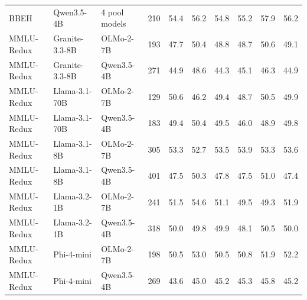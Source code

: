 \begin{tabular}{lll r rrrrrr}
BBEH & Qwen3.5-4B & 4 pool models & 210 & 54.4 & 56.2 & 54.8 & 55.2 & 57.9 & 56.2 \\
MMLU-Redux & Granite-3.3-8B & OLMo-2-7B & 193 & 47.7 & 50.4 & 48.8 & 48.7 & 50.6 & 49.1 \\
MMLU-Redux & Granite-3.3-8B & Qwen3.5-4B & 271 & 44.9 & 48.6 & 44.3 & 45.1 & 46.3 & 44.9 \\
MMLU-Redux & Llama-3.1-70B & OLMo-2-7B & 129 & 50.6 & 46.2 & 49.4 & 48.7 & 50.5 & 49.9 \\
MMLU-Redux & Llama-3.1-70B & Qwen3.5-4B & 183 & 49.4 & 50.4 & 49.5 & 46.0 & 48.9 & 49.8 \\
MMLU-Redux & Llama-3.1-8B & OLMo-2-7B & 305 & 53.3 & 52.7 & 53.5 & 53.9 & 53.3 & 53.6 \\
MMLU-Redux & Llama-3.1-8B & Qwen3.5-4B & 401 & 47.5 & 50.3 & 47.8 & 47.5 & 51.0 & 47.4 \\
MMLU-Redux & Llama-3.2-1B & OLMo-2-7B & 241 & 51.5 & 54.6 & 51.1 & 49.5 & 49.3 & 51.9 \\
MMLU-Redux & Llama-3.2-1B & Qwen3.5-4B & 318 & 50.0 & 49.8 & 49.9 & 48.1 & 50.5 & 50.0 \\
MMLU-Redux & Phi-4-mini & OLMo-2-7B & 198 & 50.5 & 53.0 & 50.5 & 50.8 & 51.9 & 52.2 \\
MMLU-Redux & Phi-4-mini & Qwen3.5-4B & 269 & 43.6 & 45.0 & 45.2 & 45.3 & 45.8 & 45.2 \\
\bottomrule
\end{tabular}
